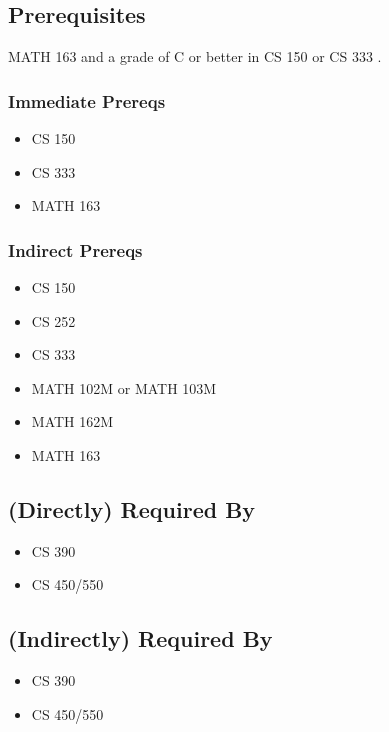 \documentclass[]{article}
\providecommand{\tightlist}{%
  \setlength{\itemsep}{0pt}\setlength{\parskip}{0pt}}
\begin{document}
\subsection{Prerequisites}\label{prerequisites-22}

MATH 163 and a grade of C or better in CS 150 or CS 333 .

\subsubsection{Immediate Prereqs}\label{immediate-prereqs-15}

\begin{itemize}
\tightlist
\item
  CS 150
\item
  CS 333
\item
  MATH 163
\end{itemize}

\subsubsection{Indirect Prereqs}\label{indirect-prereqs-15}

\begin{itemize}
\tightlist
\item
  CS 150
\item
  CS 252
\item
  CS 333
\item
  MATH 102M or MATH 103M
\item
  MATH 162M
\item
  MATH 163
\end{itemize}

\subsection{(Directly) Required By}\label{directly-required-by-11}

\begin{itemize}
\tightlist
\item
  CS 390
\item
  CS 450/550
\end{itemize}

\subsection{(Indirectly) Required By}\label{indirectly-required-by-11}

\begin{itemize}
\tightlist
\item
  CS 390
\item
  CS 450/550
\end{itemize}
\end{document}
